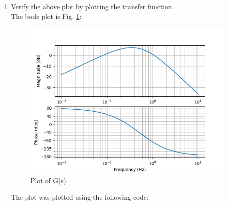 \begin{enumerate}[label=\thesection.\arabic*.,ref=\thesection.\theenumi]
\item Verify the above plot by plotting the transfer function.\\
\solution
The bode plot is Fig. \ref{fig:ep18btech11016_fig2}:
\begin{center}
    \begin{figure}[!h]
    \centering
    \includegraphics[width=\columnwidth]{./figs/ep18btech11016_fig2.png}
    \caption{Plot of G(s)}
    \label{fig:ep18btech11016_fig2}
    \end{figure}
\end{center}

The plot was plotted using the following code:


\end{enumerate}
